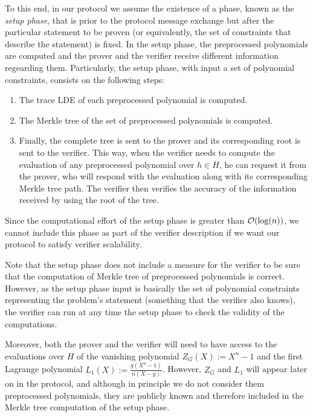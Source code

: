 To this end, in our protocol we assume the existence of a phase, known as the \textit{setup phase}, that is prior to the protocol message exchange but after the particular statement to be proven (or equivalently, the set of constraints that describe the statement) is fixed. In the setup phase, the preprocessed polynomials are computed and the prover and the verifier receive different information regearding them. Particularly, the setup phase, with input a set of polynomial constraints, consists on the following steps:
\begin{enumerate}
  \item The trace LDE of each preprocessed polynomial is computed. 
  \item The Merkle tree of the set of preprocessed polynomials is computed.
  \item Finally, the complete tree is sent to the prover and its corresponding root is sent to the verifier. This way, when the verifier needs to compute the evaluation of any preprocessed polynomial over $h \in H$, he can request it from the prover, who will respond with the evaluation along with its corresponding Merkle tree path. The verifier then verifies the accuracy of the information received by using the root of the tree.
\end{enumerate}
\begin{remark}
  Since the computational effort of the setup phase is greater than $\mathcal{O}(\log(n))$, we cannot include this phase as part of the verifier description if we want our protocol to satisfy verifier scalability.
\end{remark} 

Note that the setup phase does not include a measure for the verifier to be sure that the computation of Merkle tree of preprocessed polynomials is correct. However, as the setup phase input is basically the set of polynomial constraints representing the problem's statement (something that the verifier also knows), the verifier can run at any time the setup phase to check the validity of the computations.

Moreover, both the prover and the verifier will need to have access to the evaluations over $H$ of the vanishing polynomial $Z_G(X) := X^n -1$ and the first Lagrange polynomial $L_1(X) := \frac{g(X^n-1)}{n(X-g)}$. However, $Z_G$ and $L_1$ will appear later on in the protocol, and although in principle we do not consider them preprocessed polynomials, they are publicly known and therefore included in the Merkle tree computation of the setup phase.


